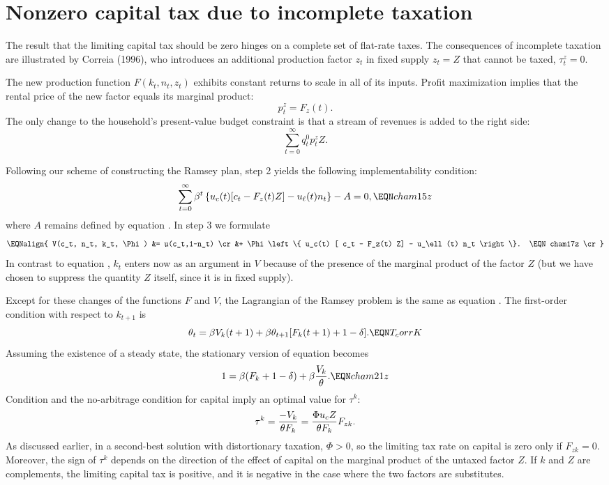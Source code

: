 %

\section{Nonzero capital tax due to incomplete taxation}
The result that the limiting capital tax should be zero
hinges on a complete set of flat-rate taxes. The consequences of incomplete
taxation are illustrated by Correia (1996),
 who introduces an additional production factor $z_t$ in fixed supply
$z_t=Z$ that cannot be taxed, $\tau^z_t=0$.

The new production function $F(k_t,n_t,z_t)$ exhibits constant returns
to scale in all of its inputs. Profit maximization implies that the rental
price of the new factor equals its marginal product:
$$
p^z_t = F_z(t).
$$
The only change to the household's present-value budget constraint 
is that a stream of revenues is added to the right side:
$$
\sum_{t=0}^\infty q^0_t p^z_t Z.
$$

Following our scheme of constructing the Ramsey plan, step 2 yields the
following implementability condition:
$$
 \sum_{t=0}^\infty \beta^t \left\{u_c(t)[ c_t - F_z(t) Z]
           - u_\ell(t) n_t \right\}  - A = 0,      \EQN cham15z $$
where $A$ remains defined by equation . In step 3 we formulate
$$\EQNalign{
V(c_t, n_t, k_t, \Phi) &= u(c_t,1-n_t)                           \cr
    &+ \Phi \left\{ u_c(t) [ c_t - F_z(t) Z] - u_\ell(t) n_t \right\}.
                                                   \EQN cham17z \cr}$$
In contrast to equation , $k_t$ enters now as an argument
in $V$ because of the presence of the marginal product of the factor
$Z$ (but we have chosen to suppress the quantity $Z$ itself, since
it is in fixed supply).

Except for these changes of the functions $F$ and $V$, the Lagrangian
of the Ramsey problem is the same as equation . The first-order
condition with respect to $k_{t+1}$ is
$$
\theta_{t} = \beta V_k(t+1) + \beta \theta_{t+1} [ F_k(t+1) + 1 -\delta].
                                                       \EQN T_corrK
$$
Assuming the existence of a steady state, the stationary version of
equation  becomes
$$ 1 = \beta( F_k + 1 -\delta ) + \beta {V_k \over \theta}.
                                                         \EQN cham21z $$
Condition  and the no-arbitrage condition for
capital  imply an optimal value for $\tau^k$:
$$
\tau^k = {-V_k \over \theta F_k } =
         {\Phi u_c Z \over \theta F_k } F_{zk}.
$$
As discussed earlier, in a second-best solution with distortionary
taxation, $\Phi>0$, so the limiting tax rate on capital is zero only if $F_{zk}=0$.
Moreover, the sign of $\tau^k$ depends on the
direction of the effect of capital on the marginal product of the untaxed
factor $Z$. If $k$ and $Z$ are complements, the limiting capital
tax is positive, and it is negative in the case where the two factors
are substitutes.

